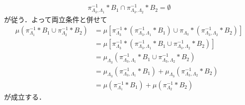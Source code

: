 \begin{prf}
\begin{description}
				\begin{align}
					\pi_{\Lambda_3,\Lambda_1}^{-1} \ast B_1 \cap \pi_{\Lambda_3,\Lambda_2}^{-1} \ast B_2 = \emptyset
				\end{align}
				が従う．よって両立条件と併せて
				\begin{align}
					\mu\left( \pi_{\Lambda_1}^{-1} \ast B_1 \cup \pi_{\Lambda_2}^{-1} \ast B_2 \right)
					&= \mu\left[\pi_{\Lambda_3}^{-1} \ast \left( \pi_{\Lambda_3,\Lambda_1}^{-1} \ast B_1 \right)
					\cup \pi_{\Lambda_3} \ast \left( \pi_{\Lambda_3,\Lambda_2}^{-1} \ast B_2 \right) \right] \\
					&= \mu\left[ \pi_{\Lambda_3}^{-1} \ast \left( \pi_{\Lambda_3,\Lambda_1}^{-1} \ast B_1 \cup \pi_{\Lambda_3,\Lambda_2}^{-1} \ast B_2 \right) \right] \\
					&= \mu_{\Lambda_3} \left( \pi_{\Lambda_3,\Lambda_1}^{-1} \ast B_1 \cup \pi_{\Lambda_3,\Lambda_2}^{-1} \ast B_2 \right) \\
					&= \mu_{\Lambda_3} \left( \pi_{\Lambda_3,\Lambda_1}^{-1} \ast B_1 \right)
						+ \mu_{\Lambda_3} \left( \pi_{\Lambda_3,\Lambda_2}^{-1} \ast B_2 \right) \\
					&= \mu\left( \pi_{\Lambda_1}^{-1} \ast B_1 \right)
						+ \mu\left( \pi_{\Lambda_2}^{-1} \ast B_2 \right)
				\end{align}
				が成立する．
			

\end{description}
\end{prf}
